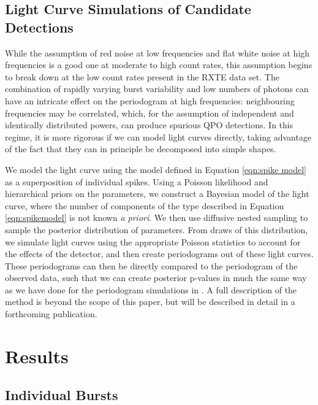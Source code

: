 \documentclass[numberedappendix]{emulateapj}
\begin{document}
\subsection{Light Curve Simulations of Candidate Detections}

While the assumption of red noise at low frequencies and flat white noise at high frequencies is a good one at moderate to high count rates, this assumption begins to break down at the low count rates present in the RXTE data set. The combination of rapidly varying burst variability and low numbers of photons can have an intricate effect on the periodogram at high frequencies: neighbouring frequencies may be correlated, which, for the assumption of independent and identically distributed powers, can produce spurious QPO detections. In this regime, it is more rigorous if we can model light curves directly, taking advantage of the fact that they can in principle be decomposed into simple shapes.

We model the light curve using the model defined in Equation \ref{eqn:spike model} as a superposition of individual spikes. Using a Poisson likelihood and hierarchical priors on the parameters, we construct a Bayesian model of the light curve, where the number of components of the type described in Equation \ref{eqn:spikemodel} is not known {\it a priori}. We then use diffusive nested sampling \citep{brewer2011} to sample the posterior distribution of parameters. From draws of this distribution, we simulate light curves using the appropriate Poisson statistics to account for the effects of the detector, and then create periodograms out of these light curves. These periodograms can then be directly compared to the periodogram of the observed data, such that we can create posterior p-values in much the same way as we have done for the periodogram simulations in \citep{huppenkothen13}. A full description of the method is beyond the scope of this paper, but will be described in detail in a forthcoming publication. 


\section{Results}
\label{sec:results}


\subsection{Individual Bursts}
\end{document}
